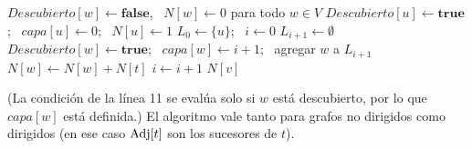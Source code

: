 \begin{algorithm}[H]
\caption{Cantidad de caminos mínimos de $u$ a $v$}
\begin{algorithmic}[1]
  \State $Descubierto[w]\gets\textbf{false}$, \ $N[w]\gets0$ para todo $w\in V$
  \State $Descubierto[u]\gets\textbf{true}$; \ $capa[u]\gets0$; \ $N[u]\gets1$
  \State $L_0\gets\{u\}$; \ $i\gets0$
    \State $L_{i+1}\gets\emptyset$
          \State $Descubierto[w]\gets\textbf{true}$; \ $capa[w]\gets i+1$; \ agregar $w$ a $L_{i+1}$
        \EndIf
          \State $N[w]\gets N[w]+N[t]$
        \EndIf
      \EndFor
    \EndFor
    \State $i\gets i+1$
  \EndWhile
  \State \Return $N[v]$ 
\EndFunction
\end{algorithmic}
\end{algorithm}
(La condición de la línea 11 se evalúa solo si $w$ está descubierto, por lo que $capa[w]$ está definida.) El algoritmo
vale tanto para grafos no dirigidos como dirigidos (en ese caso $\mathrm{Adj}[t]$ son los sucesores de $t$).

